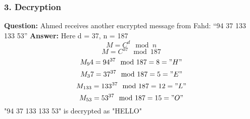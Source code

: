 \documentclass[a4paper]{article}
\begin{document}
\begin{itemize}
          \subsubsection*{3. Decryption}
          \textbf{Question: }Ahmed receives another encrypted message from Fahd: “94 37 133 133 53”
          \textbf{Answer: }
          Here d = 37, n = 187
          \[ M = C^d \mod n \]
          \[ M = C^{37} \mod 187 \]
          \[ M_94 = 94^{37}\mod 187 = 8 = "H" \]
          \[ M_37 = 37^{37}\mod 187 = 5 = "E" \]
          \[ M_{133} = 133^{37}\mod 187 = 12 = "L" \]
          \[ M_{53} = 53^{37}\mod 187 = 15 = "O" \]
          "94 37 133 133 53" is decrypted as "HELLO"
\end{itemize}
\end{document}
